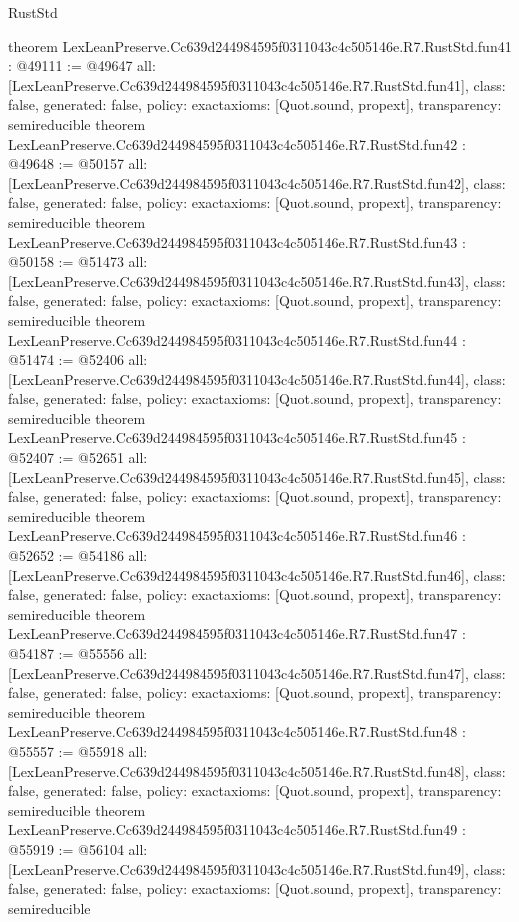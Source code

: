 \begin{lexlean}{RustStd}
\begin{coremodule}
{}
theorem LexLeanPreserve.Cc639d244984595f0311043c4c505146e.R7.RustStd.fun41 : @49111 := @49647 {
  all: [LexLeanPreserve.Cc639d244984595f0311043c4c505146e.R7.RustStd.fun41],
  class: false,
  generated: false,
  policy: exact{axioms: [Quot.sound, propext]},
  transparency: semireducible
}
theorem LexLeanPreserve.Cc639d244984595f0311043c4c505146e.R7.RustStd.fun42 : @49648 := @50157 {
  all: [LexLeanPreserve.Cc639d244984595f0311043c4c505146e.R7.RustStd.fun42],
  class: false,
  generated: false,
  policy: exact{axioms: [Quot.sound, propext]},
  transparency: semireducible
}
theorem LexLeanPreserve.Cc639d244984595f0311043c4c505146e.R7.RustStd.fun43 : @50158 := @51473 {
  all: [LexLeanPreserve.Cc639d244984595f0311043c4c505146e.R7.RustStd.fun43],
  class: false,
  generated: false,
  policy: exact{axioms: [Quot.sound, propext]},
  transparency: semireducible
}
theorem LexLeanPreserve.Cc639d244984595f0311043c4c505146e.R7.RustStd.fun44 : @51474 := @52406 {
  all: [LexLeanPreserve.Cc639d244984595f0311043c4c505146e.R7.RustStd.fun44],
  class: false,
  generated: false,
  policy: exact{axioms: [Quot.sound, propext]},
  transparency: semireducible
}
theorem LexLeanPreserve.Cc639d244984595f0311043c4c505146e.R7.RustStd.fun45 : @52407 := @52651 {
  all: [LexLeanPreserve.Cc639d244984595f0311043c4c505146e.R7.RustStd.fun45],
  class: false,
  generated: false,
  policy: exact{axioms: [Quot.sound, propext]},
  transparency: semireducible
}
theorem LexLeanPreserve.Cc639d244984595f0311043c4c505146e.R7.RustStd.fun46 : @52652 := @54186 {
  all: [LexLeanPreserve.Cc639d244984595f0311043c4c505146e.R7.RustStd.fun46],
  class: false,
  generated: false,
  policy: exact{axioms: [Quot.sound, propext]},
  transparency: semireducible
}
theorem LexLeanPreserve.Cc639d244984595f0311043c4c505146e.R7.RustStd.fun47 : @54187 := @55556 {
  all: [LexLeanPreserve.Cc639d244984595f0311043c4c505146e.R7.RustStd.fun47],
  class: false,
  generated: false,
  policy: exact{axioms: [Quot.sound, propext]},
  transparency: semireducible
}
theorem LexLeanPreserve.Cc639d244984595f0311043c4c505146e.R7.RustStd.fun48 : @55557 := @55918 {
  all: [LexLeanPreserve.Cc639d244984595f0311043c4c505146e.R7.RustStd.fun48],
  class: false,
  generated: false,
  policy: exact{axioms: [Quot.sound, propext]},
  transparency: semireducible
}
theorem LexLeanPreserve.Cc639d244984595f0311043c4c505146e.R7.RustStd.fun49 : @55919 := @56104 {
  all: [LexLeanPreserve.Cc639d244984595f0311043c4c505146e.R7.RustStd.fun49],
  class: false,
  generated: false,
  policy: exact{axioms: [Quot.sound, propext]},
  transparency: semireducible
}
\end{coremodule}
\end{lexlean}
